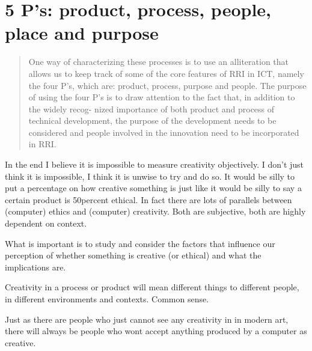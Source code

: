 \section{5 P’s: product, process, people, place and purpose}

\begin{quote}
  One way of characterizing these processes is to use an alliteration that allows us to keep track of some of the core features of RRI in ICT, namely the four P's, which are: product, process, purpose and people. The purpose of using the four P's is to draw attention to the fact that, in addition to the widely recog- nized importance of both product and process of technical development, the purpose of the development needs to be considered and people involved in the innovation need to be incorporated in RRI.\@ \citep[p.203, my emphasis]{Stahl2013}
\end{quote}

\begin{comment}
  combine the 4 P’s with purpose//
  5 P’s: product, process, people, place and purpose//
  Why is the purpose important?//
  Interpreting or Measuring?//
  Maybe we should not be looking for metrics but rather guidelines for interpretations of creativity.
\end{comment}

\begin{draft}
  In the end I believe it is impossible to measure creativity objectively. I don’t just think it is impossible, I think it is unwise to try and do so. It would be silly to put a percentage on how creative something is just like it would be silly to say a certain product is 50percent ethical. In fact there are lots of parallels between (computer) ethics and (computer) creativity. Both are subjective, both are highly dependent on context.

  What is important is to study and consider the factors that influence our perception of whether something is creative (or ethical) and what the implications are.

  Creativity in a process or product will mean different things to different people, in different environments and contexts.
  Common sense.

  Just as there are people who just cannot see any creativity in in modern art, there will always be people who wont accept anything produced by a computer as creative.
\end{draft}%
